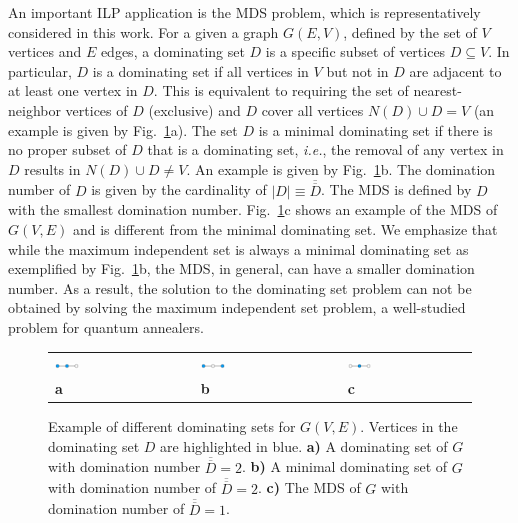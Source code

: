 \documentclass[prd,twocolumn,tightenlines,preprintnumbers,showpacs,superscriptaddress,notitlepage,nofootinbib,eqsecnum,floatfix,longbibliography,aps,10pt]{revtex4-1}
\begin{document}
An important ILP application is the MDS problem, which is representatively considered in this work.
For a given a graph $G(E,V)$, defined by the set of $V$ vertices and $E$ edges, a dominating set $D$ is a specific subset of vertices $D \subseteq V$.
In particular, $D$ is a dominating set if all vertices in $V$ but not in $D$ are adjacent to at least one vertex in $D$.
This is equivalent to requiring the set of nearest-neighbor vertices of $D$ (exclusive) and $D$ cover all vertices $N(D) \cup D = V$ (an example is given by Fig.~\ref{fig:dominating_sets}a).
The set $D$ is a minimal dominating set if there is no proper subset of $D$ that is a dominating set, {\it{i.e.}}, the removal of any vertex in $D$ results in $N(D) \cup D  \neq V$.
An example is given by Fig.~\ref{fig:dominating_sets}b.
The domination number of $D$ is given by the cardinality of $|D| \equiv \overline{\overline{D}}$.
The MDS is defined by $D$ with the smallest domination number.
Fig.~\ref{fig:dominating_sets}c shows an example of the MDS of $G(V, E)$ and is different from the minimal dominating set.
We emphasize that while the maximum independent set is always a minimal dominating set as exemplified by Fig.~\ref{fig:dominating_sets}b, the MDS, in general, can have a smaller domination number.
As a result, the solution to the dominating set problem can not be obtained by solving the maximum independent set problem, a well-studied problem for quantum annealers.

\begin{figure}
	\centering
	\begin{tabular}{p{}p{}p{}p{}p{}}
	\includegraphics[width=0.2\textwidth]{./MDS_mds0.pdf}
&&
	\includegraphics[width=0.2\textwidth]{./MDS_mds1.pdf}
&&
	\includegraphics[width=0.2\textwidth]{./MDS_mds2.pdf}\\
	\centering\textbf{a} && \centering\textbf{b} && \centering\textbf{c}
	\end{tabular}
	\caption{Example of different dominating sets for $G(V, E)$. Vertices in the dominating set $D$ are highlighted in blue. {\textbf{a)}} A dominating set of $G$ with domination number $\overline{\overline{D}} = 2$. {\textbf{b)}} A minimal dominating set of $G$ with domination number of $\overline{\overline{D}} = 2$. {\textbf{c)}} The MDS of $G$ with domination number of $\overline{\overline{D}} = 1$.}
	\label{fig:dominating_sets}
\end{figure}
\end{document}
